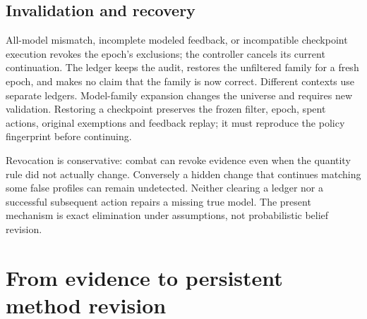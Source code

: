 \documentclass[11pt]{article}
\theoremstyle{definition}
\begin{document}
\subsection{Invalidation and recovery}
All-model mismatch, incomplete modeled feedback, or incompatible checkpoint
execution revokes the epoch's exclusions; the controller cancels its current
continuation. The ledger keeps the audit, restores the unfiltered family for a
fresh epoch, and makes no claim that the family is now correct. Different
contexts use separate ledgers. Model-family expansion changes the universe and
requires new validation. Restoring a checkpoint preserves the frozen filter,
epoch, spent actions, original exemptions and feedback replay; it must reproduce
the policy fingerprint before continuing.

Revocation is conservative: combat can revoke evidence even when the quantity
rule did not actually change. Conversely a hidden change that continues matching
some false profiles can remain undetected. Neither clearing a ledger nor a
successful subsequent action repairs a missing true model. The present mechanism
is exact elimination under assumptions, not probabilistic belief revision.

\section{From evidence to persistent method revision}
\end{document}
